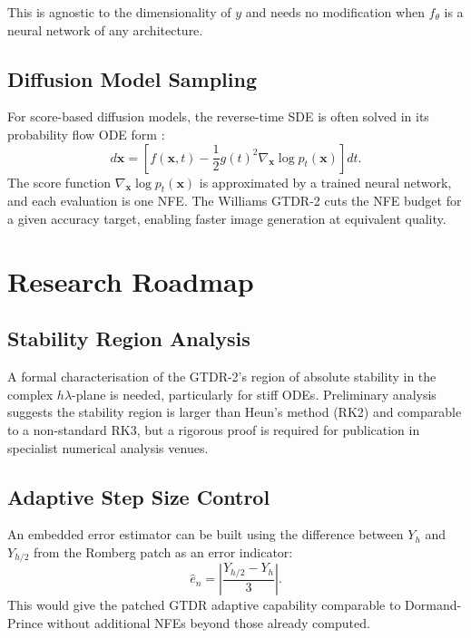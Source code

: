 \documentclass[conference]{IEEEtran}
\begin{document}
This is agnostic to the dimensionality of $y$ and needs no modification
when $f_\theta$ is a neural network of any architecture.

\subsection{Diffusion Model Sampling}

For score-based diffusion models, the reverse-time SDE is often solved
in its probability flow ODE form \cite{song2020score}:
%
\begin{equation}
    d\mathbf{x} = \left[f(\mathbf{x},t) - \frac{1}{2}g(t)^2
    \nabla_\mathbf{x} \log p_t(\mathbf{x})\right] dt.
\end{equation}
%
The score function $\nabla_\mathbf{x} \log p_t(\mathbf{x})$ is
approximated by a trained neural network, and each evaluation is one
NFE. The Williams GTDR-2 cuts the NFE budget for a given accuracy
target, enabling faster image generation at equivalent quality.

\section{Research Roadmap}
\label{sec:roadmap}

\subsection{Stability Region Analysis}

A formal characterisation of the GTDR-2's region of absolute stability in
the complex $h\lambda$-plane is needed, particularly for stiff ODEs.
Preliminary analysis suggests the stability region is larger than Heun's
method (RK2) and comparable to a non-standard RK3, but a rigorous proof
is required for publication in specialist numerical analysis venues.

\subsection{Adaptive Step Size Control}

An embedded error estimator can be built using the difference between
$Y_h$ and $Y_{h/2}$ from the Romberg patch as an error indicator:
%
\begin{equation}
    \hat{e}_n = \left|\frac{Y_{h/2} - Y_h}{3}\right|.
\end{equation}
%
This would give the patched GTDR adaptive capability comparable to
Dormand-Prince without additional NFEs beyond those already computed.
\end{document}

